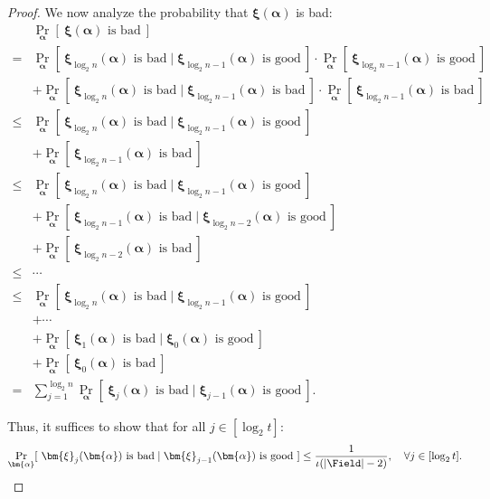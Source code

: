 \begin{proof}
We now analyze the probability that $\bm{\xi}(\bm{\alpha})$ is bad:
{\allowdisplaybreaks
\begin{align}
\label{eq:serialprobability}
\nonumber
& \Pr_{\bm{\alpha}}[~\bm{\xi}(\bm{\alpha}) \text{ is bad}~]
\\ \nonumber
= &
    \Pr_{\bm{\alpha}}[~\bm{\xi}_{\log_2 n}(\bm{\alpha}) \text{ is bad} \mid \bm{\xi}_{\log_2 n -1}(\bm{\alpha}) \text{ is good} ~] \cdot 
    \Pr_{\bm{\alpha}}[~\bm{\xi}_{\log_2 n -1}(\bm{\alpha}) \text{ is good}~]
\\ \nonumber
&
    +    \Pr_{\bm{\alpha}}[~\bm{\xi}_{\log_2 n}(\bm{\alpha}) \text{ is bad} \mid \bm{\xi}_{\log_2 n -1}(\bm{\alpha}) \text{ is bad} ~] \cdot 
    \Pr_{\bm{\alpha}}[~\bm{\xi}_{\log_2 n -1}(\bm{\alpha}) \text{ is bad}~]
\\ \nonumber
\le &
    \Pr_{\bm{\alpha}}[~\bm{\xi}_{\log_2 n}(\bm{\alpha}) \text{ is bad} \mid \bm{\xi}_{\log_2 n -1}(\bm{\alpha}) \text{ is good} ~]
\\ \nonumber
&
    +
    \Pr_{\bm{\alpha}}[~\bm{\xi}_{\log_2 n -1}(\bm{\alpha}) \text{ is bad}~]
\\ \nonumber
\le &
    \Pr_{\bm{\alpha}}[~\bm{\xi}_{\log_2 n}(\bm{\alpha}) \text{ is bad} \mid \bm{\xi}_{\log_2 n -1}(\bm{\alpha}) \text{ is good} ~]
\\ \nonumber
&
    + \Pr_{\bm{\alpha}}[~\bm{\xi}_{\log_2 n - 1}(\bm{\alpha}) \text{ is bad} \mid \bm{\xi}_{\log_2 n -2}(\bm{\alpha}) \text{ is good} ~]
\\ \nonumber
&
    +
    \Pr_{\bm{\alpha}}[~\bm{\xi}_{\log_2 n - 2}(\bm{\alpha}) \text{ is bad}~]
\\ \nonumber
\le &
    \cdots
\\ \nonumber
\le &
    \Pr_{\bm{\alpha}}[~\bm{\xi}_{\log_2 n}(\bm{\alpha}) \text{ is bad} \mid \bm{\xi}_{\log_2 n -1}(\bm{\alpha}) \text{ is good} ~]
\\ \nonumber
&
+ \cdots
\\ \nonumber
&
    + \Pr_{\bm{\alpha}}[~\bm{\xi}_{1}(\bm{\alpha}) \text{ is bad} \mid \bm{\xi}_{0}(\bm{\alpha}) \text{ is good} ~]
\\ \nonumber
&
    +
    \Pr_{\bm{\alpha}}[~\bm{\xi}_{0}(\bm{\alpha}) \text{ is bad}~]
\\
=&
\sum_{j=1}^{\log_2 n}
\Pr_{\bm{\alpha}}[~\bm{\xi}_{j}(\bm{\alpha}) \text{ is bad} \mid \bm{\xi}_{j-1}(\bm{\alpha}) \text{ is good} ~].
\end{align}
}

Thus, it suffices to show that for all $j \in [\log_2 t]$:
\begin{equation}
\label{eq:conditionalprobability}
    \Pr_{\bm{\alpha}}[~\bm{\xi}_{j}(\bm{\alpha}) \text{ is bad} \mid \bm{\xi}_{j-1}(\bm{\alpha}) \text{ is good} ~]
    \le \frac{1}{\iota (|\Field|-2)},
    \quad
    \forall j \in [\log_2 t].
\end{equation}


\end{proof}
